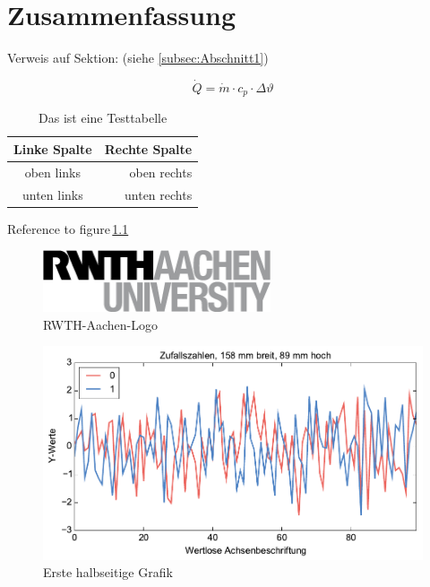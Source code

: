 \chapter{Zusammenfassung}
\label{cha:Zusammenfassung}
Verweis auf Sektion: (siehe \ref{subsec:Abschnitt1})

\begin{equation}
\dot{Q}=\dot{m}\cdot c_p \cdot \Delta \vartheta
\end{equation}



\begin{table} %
	\centering
	\caption{Das ist eine Testtabelle}\vspace{6pt}
	\label{tab:Table}
\begin{tabular}{cr} 
\toprule
\textbf{Linke Spalte} & \textbf{Rechte Spalte}\\
\midrule 
oben links & oben rechts \\ \midrule 
unten links & unten rechts \\ 
\bottomrule 
\end{tabular}
\end{table}

\Blindtext

Reference to figure\,\ref{fig:RWTH-Aachen-Logo}
\begin{figure} %
\centering
\includegraphics[width=0.60\textwidth]{Pictures/RWTHAACHENUNIVERSITY_sw.png}
\caption{RWTH-Aachen-Logo}
\label{fig:RWTH-Aachen-Logo}
\end{figure}

\Blindtext
\begin{figure}
\includegraphics[scale=1]{Pictures/halbeSeite1}
\caption{Erste halbseitige Grafik}
\label{fig:sinnvolles_label1}
\end{figure}

